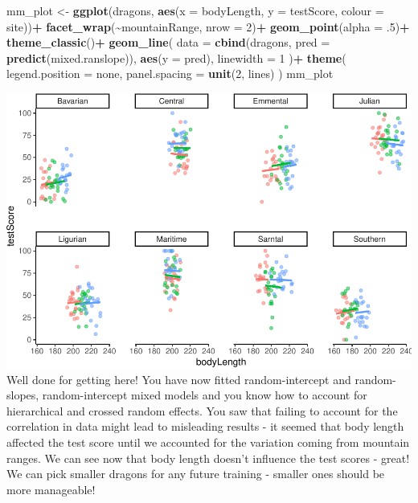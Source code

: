 \documentclass[
]{article}
\newenvironment{Shaded}{\begin{snugshade}}{\end{snugshade}}
\newcommand{\AttributeTok}[1]{\textcolor[rgb]{0.13,0.29,0.53}{#1}}
\newcommand{\DecValTok}[1]{\textcolor[rgb]{0.00,0.00,0.81}{#1}}
\newcommand{\FunctionTok}[1]{\textcolor[rgb]{0.13,0.29,0.53}{\textbf{#1}}}
\newcommand{\NormalTok}[1]{#1}
\newcommand{\OtherTok}[1]{\textcolor[rgb]{0.56,0.35,0.01}{#1}}
\newcommand{\SpecialCharTok}[1]{\textcolor[rgb]{0.81,0.36,0.00}{\textbf{#1}}}
\newcommand{\StringTok}[1]{\textcolor[rgb]{0.31,0.60,0.02}{#1}}
\begin{document}
\begin{Shaded}
\begin{Highlighting}[]
\NormalTok{mm\_plot }\OtherTok{\textless{}{-}} \FunctionTok{ggplot}\NormalTok{(dragons, }\FunctionTok{aes}\NormalTok{(}\AttributeTok{x =}\NormalTok{ bodyLength, }\AttributeTok{y =}\NormalTok{ testScore, }\AttributeTok{colour =}\NormalTok{ site))}\SpecialCharTok{+}
  \FunctionTok{facet\_wrap}\NormalTok{(}\SpecialCharTok{\textasciitilde{}}\NormalTok{mountainRange, }\AttributeTok{nrow =} \DecValTok{2}\NormalTok{)}\SpecialCharTok{+}
  \FunctionTok{geom\_point}\NormalTok{(}\AttributeTok{alpha =}\NormalTok{ .}\DecValTok{5}\NormalTok{)}\SpecialCharTok{+}
  \FunctionTok{theme\_classic}\NormalTok{()}\SpecialCharTok{+}
  \FunctionTok{geom\_line}\NormalTok{(}
    \AttributeTok{data =} \FunctionTok{cbind}\NormalTok{(dragons, }\AttributeTok{pred =} \FunctionTok{predict}\NormalTok{(mixed.ranslope)), }
    \FunctionTok{aes}\NormalTok{(}\AttributeTok{y =}\NormalTok{ pred), }
    \AttributeTok{linewidth =} \DecValTok{1}
\NormalTok{  )}\SpecialCharTok{+}
  \FunctionTok{theme}\NormalTok{(}
    \AttributeTok{legend.position =} \StringTok{\textquotesingle{}none\textquotesingle{}}\NormalTok{,}
    \AttributeTok{panel.spacing =} \FunctionTok{unit}\NormalTok{(}\DecValTok{2}\NormalTok{, }\StringTok{\textquotesingle{}lines\textquotesingle{}}\NormalTok{)}
\NormalTok{  )}
\NormalTok{mm\_plot}
\end{Highlighting}
\end{Shaded}

\includegraphics{Introduction-to-linear-mixed-models_files/figure-latex/unnamed-chunk-23-1.pdf}
Well done for getting here! You have now fitted random-intercept and
random-slopes, random-intercept mixed models and you know how to account
for hierarchical and crossed random effects. You saw that failing to
account for the correlation in data might lead to misleading results -
it seemed that body length affected the test score until we accounted
for the variation coming from mountain ranges. We can see now that body
length doesn't influence the test scores - great! We can pick smaller
dragons for any future training - smaller ones should be more
manageable!
\end{document}
